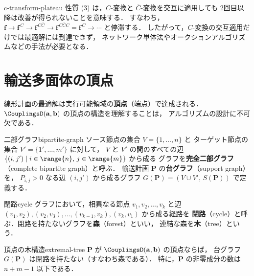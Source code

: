 \begin{remark}{}{c-transform-plateau}
  性質 (3) は，$C$-変換と $\bar{C}$-変換を交互に適用しても
  2回目以降は改善が得られないことを意味する．
  すなわち，$\mathbf{f} \to \mathbf{f}^{\,C} \to \mathbf{f}^{\,C\bar{C}}
  \to \mathbf{f}^{\,C\bar{C}C} = \mathbf{f}^{\,C} \to \cdots$
  と停滞する．
  したがって，$C$-変換の交互適用だけでは最適解には到達できず，
  ネットワーク単体法やオークションアルゴリズムなどの手法が必要となる．
\end{remark}

\section{輸送多面体の頂点}
\label{sec:vertices}

線形計画の最適解は実行可能領域の\textbf{頂点}（端点）で達成される．
$\CouplingsD(\mathbf{a}, \mathbf{b})$ の頂点の構造を理解することは，
アルゴリズムの設計に不可欠である．

\begin{definition}{二部グラフ}{bipartite-graph}
  ソース節点の集合 $V = \{1, \ldots, n\}$ と
  ターゲット節点の集合 $V' = \{1', \ldots, m'\}$ に対して，
  $V$ と $V'$ の間のすべての辺 $\{(i, j') \mid i \in \range{n},\, j \in \range{m}\}$ から成る
  グラフを\textbf{完全二部グラフ}（complete bipartite graph）と呼ぶ．
  輸送計画 $\mathbf{P}$ の\textbf{台グラフ}（support graph）を，
  $P_{i,j} > 0$ なる辺 $(i, j')$ から成るグラフ
  $G(\mathbf{P}) = (V \cup V',\, S(\mathbf{P}))$ で定義する．
\end{definition}

\begin{definition}{閉路}{cycle}
  グラフにおいて，相異なる節点 $v_1, v_2, \ldots, v_k$ と辺
  $(v_1, v_2), (v_2, v_3), \ldots, (v_{k-1}, v_k), (v_k, v_1)$ から成る経路を
  \textbf{閉路}（cycle）と呼ぶ．閉路を持たないグラフを\textbf{森}（forest）といい，
  連結な森を\textbf{木}（tree）という．
\end{definition}

\begin{proposition}{頂点の木構造}{extremal-tree}
  $\mathbf{P}$ が $\CouplingsD(\mathbf{a}, \mathbf{b})$ の頂点ならば，
  台グラフ $G(\mathbf{P})$ は閉路を持たない（すなわち森である）．
  特に，$\mathbf{P}$ の非零成分の数は $n + m - 1$ 以下である．
\end{proposition}


